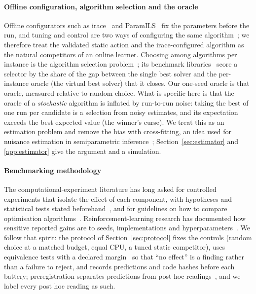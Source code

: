 \paragraph{Offline configuration, algorithm selection and the oracle} Offline configurators such as irace~\cite{LopezIbanezEtal2016} and ParamILS~\cite{HutterEtal2009} fix the parameters before the run, and tuning and control are two ways of configuring the same algorithm~\cite{EibenSmit2011}; we therefore treat the validated static action and the irace-configured algorithm as the natural competitors of an online learner. Choosing among algorithms per instance is the algorithm selection problem~\cite{Rice1976,KerschkeEtal2019}; its benchmark libraries~\cite{BischlEtal2016} score a selector by the share of the gap between the single best solver and the per-instance oracle (the virtual best solver) that it closes. Our one-seed oracle is that oracle, measured relative to random choice. What is specific here is that the oracle of a \emph{stochastic} algorithm is inflated by run-to-run noise: taking the best of one run per candidate is a selection from noisy estimates, and its expectation exceeds the best expected value (the winner's curse). We treat this as an estimation problem and remove the bias with cross-fitting, an idea used for nuisance estimation in semiparametric inference~\cite{ChernozhukovEtal2018}; Section~\ref{sec:estimator} and \ref{app:estimator} give the argument and a simulation.

\paragraph{Benchmarking methodology} The computational-experiment literature has long asked for controlled experiments that isolate the effect of each component, with hypotheses and statistical tests stated beforehand~\cite{Hooker1995,BarrEtal1995}, and for guidelines on how to compare optimisation algorithms~\cite{LaTorreEtal2021,BartzBeielsteinEtal2020}. Reinforcement-learning research has documented how sensitive reported gains are to seeds, implementations and hyperparameters~\cite{Henderson2018}. We follow that spirit: the protocol of Section~\ref{sec:protocol} fixes the controls (random choice at a matched budget, equal CPU, a tuned static competitor), uses equivalence tests with a declared margin~\cite{Lakens2017} so that ``no effect'' is a finding rather than a failure to reject, and records predictions and code hashes before each battery; preregistration separates predictions from post hoc readings~\cite{NosekEtal2018}, and we label every post hoc reading as such.

